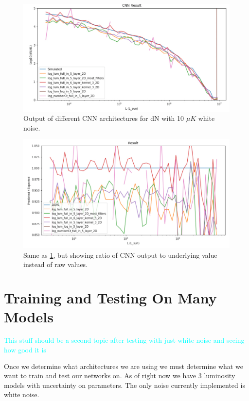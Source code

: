 \documentclass{article}
\newcommand{\dnp}[1]{\textcolor{cyan}{#1}}
\begin{document}
			\begin{figure}[H]
				\centering
				\includegraphics[width=1.0\textwidth]{arch_compare_noise_dn.pdf}
				\caption{Output of different CNN architectures for dN with 10 \(\mu K\) white noise.}
				\label{fig:arch_compare_noise_dn}
			\end{figure}

			\begin{figure}[H]
				\centering
				\includegraphics[width=1.0\textwidth]{arch_compare_noise_dn_ratio.pdf}
				\caption{Same as \cref{fig:arch_compare_noise_dn}, but showing ratio of CNN output to underlying value instead of raw values.}
				\label{fig:arch_compare_noise_dn_ratio}
			\end{figure}


	\section{Training and Testing On Many Models} \label{sec:tat}
		\dnp{This stuff should be a second topic after testing with just white noise and seeing how good it is}

		Once we determine what architectures we are using we must determine what we want to train and test our networks on.  As of right now we have 3 luminosity models with uncertainty on parameters.  The only noise currently implemented is white noise.
\end{document}
